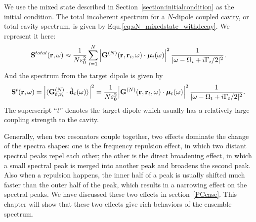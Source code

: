 We use the mixed state described in Section~\ref{section:initialcondition} as the initial condition. The total incoherent spectrum for a $N$-dipole coupled cavity, or total cavity spectrum, is given by Equ.\eqref{eq:sN_mixedstate_withdecay}. We represent it here:
\begin{equation}
\mathbf{S}^{total}(\mathbf{r},\omega)\approx \frac{1}{N\varepsilon_0^2}\sum_{i=1}^N{\left| \mathbf{G}^{(N)}(\mathbf{r},\mathbf{r}_i,\omega)\cdot {\bm \mu}_i(\omega) \right|^2 \frac{1}{|\omega-\Omega_i+i\Gamma_i/2|^2}}. \label{spectrum}
\end{equation}
%
And the spectrum from the target dipole is given by
\begin{equation}
 \label{spectrum}
 \mathbf{S}^{t}(\mathbf{r},\omega)=\left|\langle \mathbf{G}^{(N)}_{\mathbf{r},\mathbf{r}_t}\cdot \hat{\mathbf{d}}_t(\omega)\rangle\right|^2 = \frac{1}{N\varepsilon_0^2}
 {\left| \mathbf{G}^{(N)}(\mathbf{r},\mathbf{r}_t,\omega)\cdot {\bm \mu}_t(\omega) \right|^2 \frac{1}{|\omega-\Omega_t+i\Gamma_t/2|^2}}.
\end{equation}
The superscript ``$t$'' denotes the target dipole which usually has a relatively large coupling strength to the cavity.

Generally, when two resonators couple together, two effects dominate the change of the spectra shapes: one is the frequency repulsion effect, in which two distant spectral peaks repel each other; the other is the direct broadening effect, in which a small spectral peak is merged into another peak and broadens the second peak. Also when a repulsion happens, the inner half of a peak is usually shifted much faster than the outer half of the peak, which results in a narrowing effect on the spectral peaks. We have discussed these two effects in section~\ref{PCcase}. This chapter will show that these two effects give rich behaviors of the ensemble spectrum.

